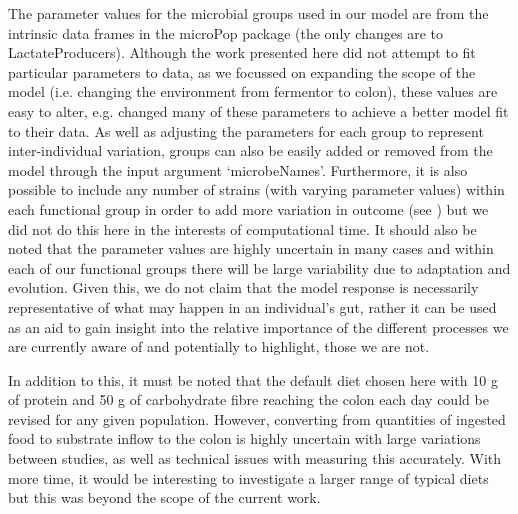 \documentclass[a4paper]{article}
\begin{document}
The parameter values for the microbial groups used in our model are from the intrinsic data frames in the microPop package (the only changes are to LactateProducers). 
Although the work presented here did not attempt to fit particular parameters to data, as we focussed on expanding the scope of the model (i.e. changing the environment from fermentor to colon), these values are easy to alter, e.g. \cite{wang} changed many of these parameters to achieve a better model fit to their data.
As well as adjusting the parameters for each group to represent inter-individual variation, groups can also be easily added or removed from the model through the input argument `microbeNames'.
Furthermore, it is also possible to include any number of strains (with varying parameter values) within each functional group in order to add more variation in outcome (see \cite{Kettle2015}) but we did not do this here in the interests of computational time.
It should also be noted that the parameter values are highly uncertain in many cases and within each of our functional groups there will be large variability due to adaptation and evolution. 
Given this, we do not claim that the model response is necessarily representative of what may happen in an individual's gut, rather it can be used as an aid to gain insight into the relative importance of the different processes we are currently aware of and potentially to highlight, those we are not. 

In addition to this, it must be noted that the default diet chosen here with 10 g of protein and 50 g of carbohydrate fibre reaching the colon each day could be revised for any given population.
However, converting from quantities of ingested food to substrate inflow to the colon is highly uncertain with large variations between studies, as well as technical issues with measuring this accurately. 
With more time, it would be interesting to investigate a larger range of typical diets but this was beyond the scope of the current work.
\end{document}
